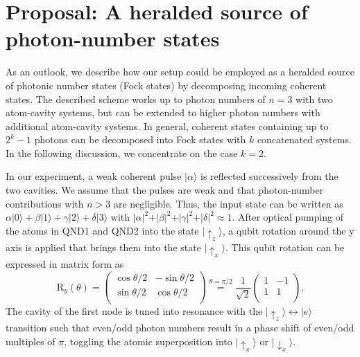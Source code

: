 \documentclass[prl,twocolumn,amsmath,amssymb,bibnotes,aps,longbibliography]{revtex4-1}
\newcommand{\ket}[1]{|{#1}\rangle}
\begin{document}
\section{Proposal: A heralded source of photon-number states}
\noindent As an outlook, we describe how our setup could be employed as a heralded source of photonic number states (Fock states) by decomposing incoming coherent states. The described scheme works up to photon numbers of $n=3$ with two atom-cavity systems, but can be extended to higher photon numbers with additional atom-cavity systems. In general, coherent states containing up to $2^{k}-1$ photons can be decomposed into Fock states with $k$ concatenated systems. In the following discussion, we concentrate on the case $k=2$. 

In our experiment, a weak coherent pulse $\ket{\alpha}$ is reflected successively from the two cavities. We assume that the pulses are weak and that photon-number contributions with $n>3$ are negligible. Thus, the input state can be written as $\alpha\ket{0}+\beta\ket{1}+\gamma\ket{2}+\delta\ket{3}$ with $\vert\alpha\vert^2+\vert\beta\vert^2+\vert\gamma\vert^2+\vert\delta\vert^2\approx 1$. After optical pumping of the atoms in QND1 and QND2 into the state $\ket{\uparrow_z}$, a qubit rotation around the y axis is applied that brings them into the state $\ket{\uparrow_x}$. This qubit rotation can be expressed in matrix form as \cite{nielsen2002} 
\begin{equation}
\text{R}_y(\theta)=\begin{pmatrix}\cos\theta/2 & -\sin\theta/2 \\\sin\theta/2 & \cos\theta/2\\\end{pmatrix}\overset{\theta=\pi/2}{=}\frac{1}{\sqrt{2}}\begin{pmatrix}1 & -1 \\1 & 1\\\end{pmatrix}.
\end{equation} The cavity of the first node is tuned into resonance with the $\ket{\uparrow_z}\leftrightarrow \ket{e}$ transition such that even/odd photon numbers result in a phase shift of even/odd multiples of $\pi$, toggling the atomic superposition into $\ket{\uparrow_x}$ or $\ket{\downarrow_x}$.
\renewcommand{\thefigure}{S2}
\end{document}

